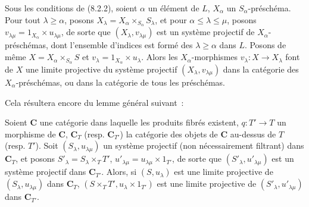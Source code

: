 \begin{proposition}[8.2.5]
\label{IV.8.2.5-fr}
Sous les conditions de (8.2.2), soient $\alpha$ un élément de $L$,
$X_\alpha$ un $S_\alpha$-préschéma. Pour tout $\lambda\geq\alpha$, posons
$X_\lambda=X_\alpha\times_{S_\alpha}S_\lambda$, et pour
$\alpha\leq\lambda\leq\mu$, posons
$v_{\lambda\mu}=1_{X_\alpha}\times u_{\lambda\mu}$, de sorte que
$(X_\lambda,v_{\lambda\mu})$ est un système projectif de
$X_\alpha$-préschémas, dont l'ensemble d'indices est formé des
$\lambda\geq\alpha$ dans $L$. Posons de même
$X=X_\alpha\times_{S_\alpha}S$ et $v_\lambda=1_{X_\alpha}\times u_\lambda$.
Alors les $X_\alpha$-morphismes $v_\lambda:X\to X_\lambda$ font de $X$ une
limite projective du système projectif $(X_\lambda,v_{\lambda\mu})$ dans la
catégorie des $X_\alpha$-préschémas, ou dans la catégorie de tous les
préschémas.
\end{proposition}

Cela résultera encore du lemme général suivant~:

\begin{lemma}[8.2.6]
\label{IV.8.2.6-fr}
Soient $\mathbf C$ une catégorie dans laquelle les produits fibrés existent,
$q:T'\to T$ un morphisme de $\mathbf C$, $\mathbf C_T$ (resp.
$\mathbf C_{T'}$) la catégorie des objets de $\mathbf C$ au-dessus
de $T$ (resp. $T'$). Soit $(S_\lambda,u_{\lambda\mu})$ un système projectif
(non nécessairement filtrant) dans $\mathbf C_T$, et posons
$S'_\lambda=S_\lambda\times_T T'$,
$u'_{\lambda\mu}=u_{\lambda\mu}\times 1_{T'}$, de sorte que
$(S'_\lambda,u'_{\lambda\mu})$ est un système projectif dans
$\mathbf C_{T'}$. Alors, si $(S,u_\lambda)$ est une limite projective de
$(S_\lambda,u_{\lambda\mu})$ dans $\mathbf C_T$,
$(S\times_T T',u_\lambda\times 1_{T'})$ est une limite projective de
$(S'_\lambda,u'_{\lambda\mu})$ dans $\mathbf C_{T'}$.
\end{lemma}

